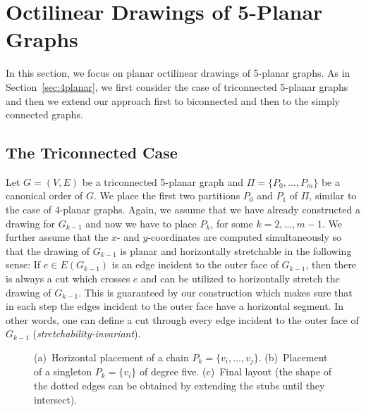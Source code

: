\documentclass[a4paper,twoside,11pt]{article}
\begin{document}
\section{Octilinear Drawings of 5-Planar Graphs}
\label{sec:5planar}


In this section, we focus on planar octilinear drawings of 5-planar
graphs. As in Section~\ref{sec:4planar}, we first consider the case
of triconnected 5-planar graphs and then we extend our approach
first to biconnected and then to the simply connected graphs.

\subsection{The Triconnected Case}
\label{sec:5tricon}


Let $G=(V,E)$ be a triconnected 5-planar graph and $\Pi = \{ P_0,
\ldots, P_m\}$ be a canonical order of $G$. We place the first two
partitions $P_0$ and $P_1$ of $\Pi$, similar to the case of 4-planar
graphs. Again, we assume that we have already constructed a drawing
for $G_{k-1}$ and now we have to place $P_k$, for some
$k=2,\ldots,m-1$. We further assume that the $x$- and
$y$-coordinates are computed simultaneously so that the drawing of
$G_{k-1}$ is planar and horizontally stretchable in the following
sense: If $e \in E(G_{k-1})$ is an edge incident to the outer face
of $G_{k-1}$, then there is always a cut which crosses $e$ and can
be utilized to horizontally stretch the drawing of $G_{k-1}$. This
is guaranteed by our construction which makes sure that in each step
the edges incident to the outer face have a horizontal segment. In
other words, one can define a cut through every edge incident to the
outer face of $G_{k-1}$ (\emph{stretchability-invariant}).

\begin{figure}[t]
    \centering
    \begin{minipage}[b]{.32\textwidth}
        \centering
    \end{minipage}
    \begin{minipage}[b]{.32\textwidth}
        \centering
    \end{minipage}
    \begin{minipage}[b]{.32\textwidth}
        \centering
    \end{minipage}
    \caption{
    (a)~Horizontal placement of a chain $P_k = \{ v_i, \ldots, v_j\}$.
    (b)~Placement of a singleton $P_k = \{ v_i \}$ of degree five.
    (c)~Final layout (the shape of the dotted edges can be obtained by extending the stubs until they intersect).}
    \label{fig:4p_canonical}
\end{figure}
\end{document}
